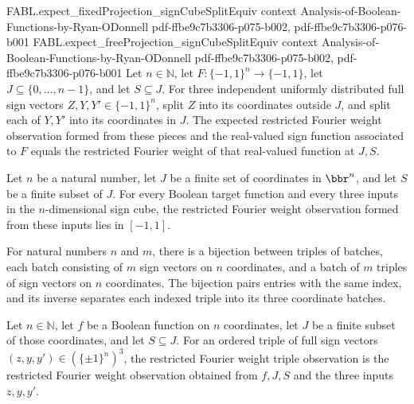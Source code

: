 \begin{theorem}
  {FABL.expect_fixedProjection_signCubeSplitEquiv}
  {context}
  {Analysis-of-Boolean-Functions-by-Ryan-ODonnell}
  {pdf-ffbe9c7b3306-p075-b002,
    pdf-ffbe9c7b3306-p076-b001}
\proofstep
  {FABL.expect_freeProjection_signCubeSplitEquiv}
  {context}
  {Analysis-of-Boolean-Functions-by-Ryan-ODonnell}
  {pdf-ffbe9c7b3306-p075-b002,
    pdf-ffbe9c7b3306-p076-b001}
Let $n\in\mathbb N$, let $F:\{−1,1\}^n\to\{−1,1\}$, let $J\subseteq\{0,\ldots,n-1\}$,
and let $S\subseteq J$. For three independent uniformly distributed full sign vectors
$Z,Y,Y'\in\{−1,1\}^n$, split $Z$ into its coordinates outside $J$, and split each of
$Y,Y'$ into its coordinates in $J$. The expected restricted Fourier weight observation
formed from these pieces and the real-valued sign function associated to $F$ equals the
restricted Fourier weight of that real-valued function at $J,S$.
\end{theorem}

\begin{theorem}
\label{FABL.restrictedFourierWeightObservationFromInputs_mem_Icc}
\leanok
{}
Let $n$ be a natural number, let $J$ be a finite set of coordinates in $\bbr^n$, and let
$S$ be a finite subset of $J$. For every Boolean target function and every three inputs
in the $n$-dimensional sign cube, the restricted Fourier weight observation formed from
these inputs lies in $[-1,1]$.
\end{theorem}

\begin{definition}
\label{FABL.restrictedFourierWeightBatchEquiv}
\leanok
For natural numbers $n$ and $m$, there is a bijection between triples of batches, each
batch consisting of $m$ sign vectors on $n$ coordinates, and a batch of $m$ triples of
sign vectors on $n$ coordinates. The bijection pairs entries with the same index, and
its inverse separates each indexed triple into its three coordinate batches.
\end{definition}

\begin{definition}
\label{FABL.restrictedFourierWeightTripleObservation}
\leanok
{}
Let $n\in\mathbb N$, let $f$ be a Boolean function on $n$ coordinates, let $J$ be a
finite subset of those coordinates, and let $S\subseteq J$. For an ordered triple of
full sign vectors $(z,y,y')\in(\{\pm1\}^n)^3$, the restricted Fourier weight triple
observation is the restricted Fourier weight observation obtained from $f,J,S$ and the
three inputs $z,y,y'$.
\end{definition}

